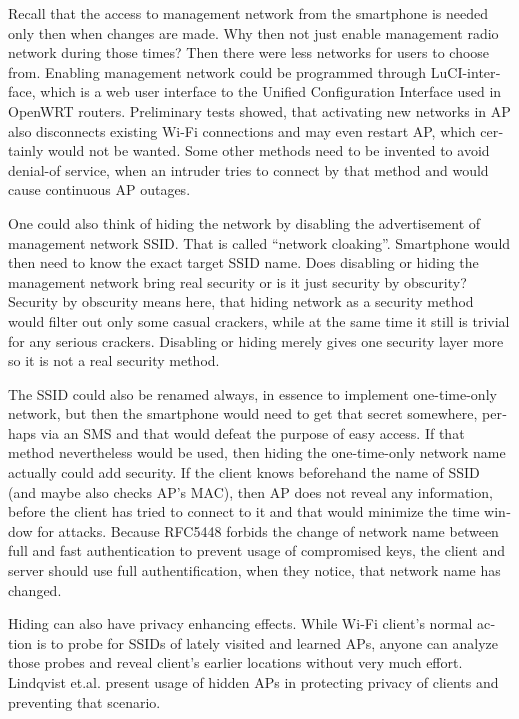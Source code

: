 \documentclass[12pt,a4paper,english]{tutthesis}
\begin{document}
\begin{otherlanguage}{english}
Recall that the access to management network from the smartphone is
 needed only then when changes
are made. Why then not just enable management radio network
during those times? Then there were less networks for users to choose from.
Enabling management network could be programmed through 
LuCI-interface, which is a web user interface to the Unified
 Configuration Interface used in OpenWRT routers.
Preliminary tests showed, that activating new networks in AP also 
disconnects existing Wi-Fi connections and may even restart AP,
which certainly would not be wanted. Some other methods need to
be invented to avoid denial-of service, when an intruder tries to 
connect by that method and would cause continuous AP outages.

\label{tag:hidessid}
One could also think of hiding the network by disabling the
advertisement of manage\-ment network SSID. That is called ``network
cloaking''.  Smartphone would then need to know the exact target SSID name.
Does disabling or hiding the management network bring real security or
is it just security by obscurity?  Security by obscurity means here,
that hiding network 
as a security method would filter out only some casual crackers, while
at the same time it still is trivial for any serious crackers.
Disabling or hiding  merely gives one security layer more so it is not
a real security method.

The SSID could also be renamed always, in essence to implement
one-time-only network, but then the smartphone would need to get that
secret somewhere, perhaps via an SMS and that would defeat the purpose
of easy access.  If that method nevertheless would be used, then
hiding the one-time-only network name actually could add security. 
If the client knows beforehand the name of SSID
(and maybe also checks AP's MAC), then AP does not reveal any information,
before the client has tried to connect to it and that would minimize
the time window for attacks. 
Because RFC5448\cite[p.12]{rfc5448} forbids the change of network name between full and
fast authentication to prevent usage of compromised keys, the client
and server should use full authentification, when they notice, that
network name has changed.




 Hiding can also have privacy enhancing effects.
While Wi-Fi client's normal action is to probe for SSIDs of lately visited
and learned APs, anyone can analyze those probes and reveal client's
earlier locations without very much effort.
Lindqvist et.al.\cite{hidden-wlan} present usage of hidden
APs in protecting privacy of clients and preventing that scenario.




\end{otherlanguage}
\end{document}
